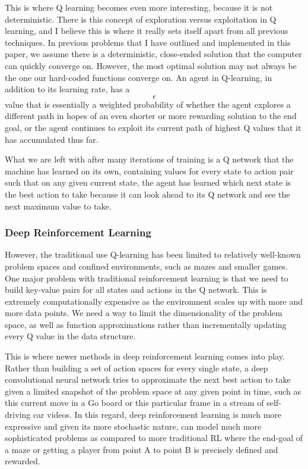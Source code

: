 \documentclass[a4paper,10pt]{extarticle}
\begin{document}
\begin{multicols}{2}
                        This is where Q learning becomes even more interesting, because it is not deterministic. There is this concept of exploration versus exploitation in Q learning, and I believe this is where it really sets itself apart from all previous techniques. In previous problems that I have outlined and implemented in this paper, we assume there is a deterministic, close-ended solution that the computer can quickly converge on. However, the most optimal solution may not always be the one our hard-coded functions converge on. An agent in Q-learning, in addition to its learning rate, has a $$\epsilon$$  value that is essentially a weighted probability of whether the agent explores a different path in hopes of an even shorter or more rewarding solution to the end goal, or the agent continues to exploit its current path of highest Q values that it has accumulated thus far. 

                        What we are left with after many iterations of training is a Q network that the machine has learned on its own, containing values for every state to action pair such that on any given current state, the agent has learned which next state is the best action to take because it can look ahead to its Q network and see the next maximum value to take.

                        \subsubsection{Deep Reinforcement Learning}
                        However, the traditional use Q-learning has been limited to relatively well-known problem spaces and confined environments, such as mazes and smaller games. One major problem with traditional reinforcement learning is that we need to build key-value pairs for all states and actions in the Q network. This is extremely computationally expensive as the environment scales up with more and more data points. We need a way to limit the dimensionality of the problem space, as well as function approximations rather than incrementally updating every Q value in the data structure. 

                        This is where newer methods in deep reinforcement learning comes into play. Rather than building a set of action spaces for every single state, a deep convolutional neural network tries to approximate the next best action to take given a limited snapshot of the problem space at any given point in time, such as this current move in a Go board or this particular frame in a stream of self-driving car videos. In this regard, deep reinforcement learning is much more expressive and given its more stochastic nature, can model much more sophisticated problems as compared to more traditional RL where the end-goal of a maze or getting a player from point A to point B is precisely defined and rewarded. 


\end{multicols}
\end{document}
